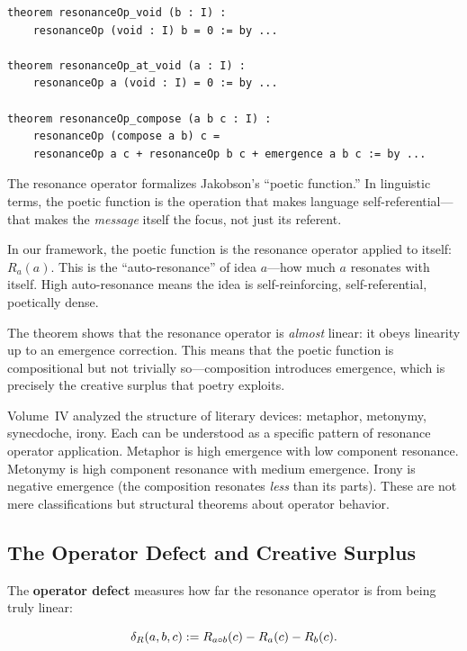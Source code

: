 \begin{lstlisting}[caption={Resonance operator (IDT\_v3\_Emergence.lean)}]
theorem resonanceOp_void (b : I) :
    resonanceOp (void : I) b = 0 := by ...
    
theorem resonanceOp_at_void (a : I) :
    resonanceOp a (void : I) = 0 := by ...
    
theorem resonanceOp_compose (a b c : I) :
    resonanceOp (compose a b) c =
    resonanceOp a c + resonanceOp b c + emergence a b c := by ...
\end{lstlisting}

\begin{interpretation}
The resonance operator formalizes Jakobson's ``poetic function.'' In linguistic
terms, the poetic function is the operation that makes language self-referential---that
makes the \emph{message} itself the focus, not just its referent.

In our framework, the poetic function is the resonance operator applied to
itself: $R_a(a)$. This is the ``auto-resonance'' of idea $a$---how much $a$
resonates with itself. High auto-resonance means the idea is self-reinforcing,
self-referential, poetically dense.

The theorem shows that the resonance operator is \emph{almost} linear: it obeys
linearity up to an emergence correction. This means that the poetic function
is compositional but not trivially so---composition introduces emergence, which
is precisely the creative surplus that poetry exploits.

Volume~IV analyzed the structure of literary devices: metaphor, metonymy,
synecdoche, irony. Each can be understood as a specific pattern of resonance
operator application. Metaphor is high emergence with low component resonance.
Metonymy is high component resonance with medium emergence. Irony is negative
emergence (the composition resonates \emph{less} than its parts). These are
not mere classifications but structural theorems about operator behavior.
\end{interpretation}

\subsection{The Operator Defect and Creative Surplus}

The \textbf{operator defect} measures how far the resonance operator is from
being truly linear:

\begin{definition}
\label{def:operator-defect}
\[
  \delta_R(a, b, c) := R_{a \circ b}(c) - R_a(c) - R_b(c).
\]
\end{definition}

